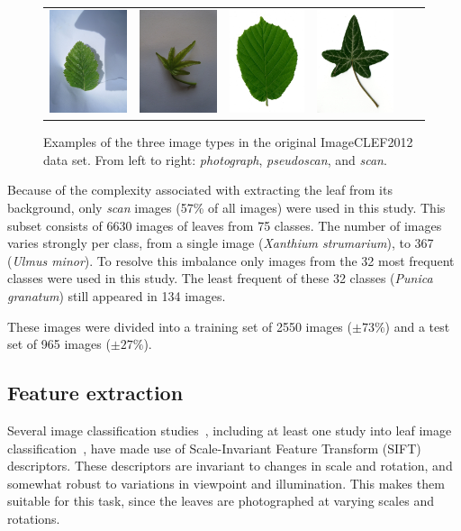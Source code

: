 \begin{figure}[htb]
{\begin{tabular}{c@{\hskip 0.1in}c|c@{\hskip 0.1in}c|c@{\hskip 0.1in}c}
\includegraphics[width = .12\textwidth]{image/5093pseudoscan.jpg} &
\includegraphics[width = .12\textwidth]{image/2655pseudoscan.jpg} &
\includegraphics[width = .12\textwidth]{image/8736scan.jpg} &
\includegraphics[width = .12\textwidth]{image/5292scan.jpg}
\end{tabular}
}
\caption{Examples of the three image types in the original ImageCLEF2012 data set. From left to right: \emph{photograph}, \emph{pseudoscan}, and \emph{scan}.}
\label{fig:imagetypes}
\end{figure}

Because of the complexity associated with extracting the leaf from its background, only \emph{scan} images (57\% of all images) were used in this study.
This subset consists of 6630 images of leaves from 75 classes.
The number of images varies strongly per class, from a single image (\emph{Xanthium strumarium}), to 367 (\emph{Ulmus minor}).
To resolve this imbalance only images from the 32 most frequent classes were used in this study. The least frequent of these 32 classes (\emph{Punica granatum}) still appeared in 134 images.

These images were divided into a training set of 2550 images ($\pm 73\%$) and a test set of 965 images ($\pm 27\%$).


\subsection{Feature extraction}
Several image classification studies~\cite{Wang2015, Lowe1999}, including at least one study into leaf image classification~\cite{Wang2011}, have made use of Scale-Invariant Feature Transform (SIFT) descriptors.
These descriptors are invariant to changes in scale and rotation, and somewhat robust to variations in viewpoint and illumination.
This makes them suitable for this task, since the leaves are photographed at varying scales and rotations.

